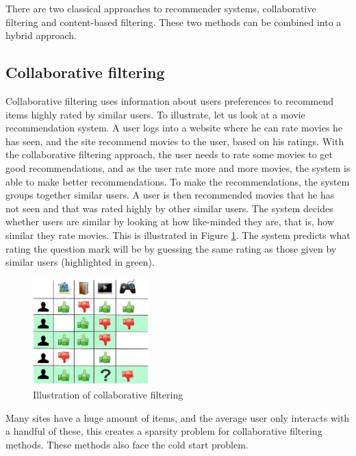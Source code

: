 There are two classical approaches to recommender systems, collaborative filtering and content-based filtering. These two methods can be combined into a hybrid approach.

\subsection{Collaborative filtering}
Collaborative filtering uses information about users preferences to recommend items highly rated by similar users. To illustrate, let us look at a movie recommendation system. A user logs into a website where he can rate movies he has seen, and the site recommend movies to the user, based on his ratings. With the collaborative filtering approach, the user needs to rate some movies to get good recommendations, and as the user rate more and more movies, the system is able to make better recommendations. To make the recommendations, the system groups together similar users. A user is then recommended movies that he has not seen and that was rated highly by other similar users. The system decides whether users are similar by looking at how like-minded they are, that is, how similar they rate movies. This is illustrated in Figure \ref{fig:collaborative-filtering}. The system predicts what rating the question mark will be by guessing the same rating as those given by similar users (highlighted in green).

\begin{figure}[htp]
	\centering
	\includegraphics[width=0.4\textwidth]{fig/collab-filtering.png}
	\caption{Illustration of collaborative filtering}
	\label{fig:collaborative-filtering}
\end{figure}

Many sites have a huge amount of items, and the average user only interacts with a handful of these, this creates a sparsity problem for collaborative filtering methods. These methods also face the cold start problem.

